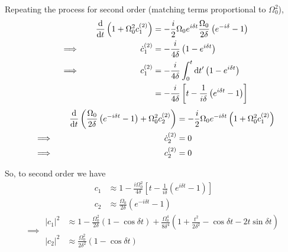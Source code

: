 \documentclass[12pt]{article}
\newcommand{\magsq}[1]{\big|#1\big|^2}
\begin{document}
Repeating the process for second order (matching terms proportional to $\Omega_0^2$),
\begin{alignat*}{3}
    &\quad & \dv{t}\left(1 + \Omega_0^2 c_1^{(2)}\right) &= -\frac{i}{2}\Omega_0e^{i\delta t}\frac{\Omega_0}{2\delta}\left(e^{-i\delta}-1\right) \\
    &\implies\quad & \dot{c}_1^{(2)} &= -\frac{i}{4\delta}\left(1 - e^{i\delta t}\right) \\
    &\implies\quad & c_1^{(2)} &= -\frac{i}{4\delta}\int_0^t \dd t'\left(1 - e^{i\delta t}\right) \\
    & & &= -\frac{i}{4\delta}\left[t - \frac{1}{i\delta}\left(e^{i\delta t} - 1\right)\right]
\end{alignat*}
\begin{alignat*}{3}
    &\quad & \dv{t}\left(\frac{\Omega_0}{2\delta}\left(e^{-i\delta t} - 1\right) + \Omega_0^2c_2^{(2)}\right) &= -\frac{i}{2}\Omega_0e^{-i\delta t}\left(1 + \Omega_0^2 c_1^{(2)}\right) \\
    &\implies\quad & \dot{c}_2^{(2)} &= 0 \\
    &\implies\quad & c_2^{(2)} &= 0
\end{alignat*}

So, to second order we have
\begin{equation*}
    \begin{aligned}
        c_1 &\approx 1 - \frac{i\Omega_0^2}{4\delta}\left[t - \frac{1}{i\delta}\left(e^{i\delta t} - 1\right)\right] \\
        c_2 &\approx \frac{\Omega_0}{2\delta}\left(e^{-i\delta t} - 1\right)
    \end{aligned}
\end{equation*}
\begin{equation*}
    \implies
    \begin{aligned}
        \magsq{c_1} &\approx 1 - \frac{\Omega_0^2}{2\delta}\left(1 - \cos\delta t\right) + \frac{\Omega_0^4}{8\delta^4}\left(1 + \frac{t^2}{2\delta^2} - \cos\delta t - 2t\sin\delta t\right)  \\
        \magsq{c_2} &\approx \frac{\Omega_0^2}{2\delta^2}\left(1 - \cos\delta t\right)
    \end{aligned}
\end{equation*}
\end{document}

